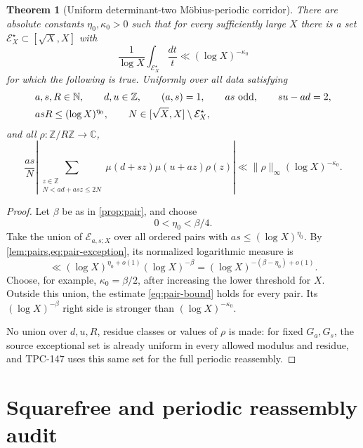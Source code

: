 \documentclass[11pt]{article}
\newtheorem{theorem}{Theorem}[section]
\theoremstyle{definition}
\theoremstyle{remark}
\begin{document}
\begin{theorem}[Uniform determinant-two M\"obius-periodic corridor]
\label{thm:main}
There are absolute constants \(\eta_0,\kappa_0>0\) such that for
every sufficiently large \(X\) there is a set
\(\mathcal E_X^\star\subset[\sqrt X,X]\) with
\begin{equation}
 \boxed{
 \frac1{\log X}\int_{\mathcal E_X^\star}\frac{dt}{t}
 \ll(\log X)^{-\kappa_0}}
\label{eq:main-exception}
\end{equation}
for which the following is true.  Uniformly over all data satisfying
\begin{align}
 &a,s,R\in\mathbb N,\qquad d,u\in\mathbb Z,\qquad
 (a,s)=1,\qquad as\ {\rm odd},\qquad su-ad=2,\notag\\
 &asR\le(\log X)^{\eta_0},\qquad
 N\in[\sqrt X,X]\setminus\mathcal E_X^\star,
\label{eq:envelope}
\end{align}
and all \(\rho:\mathbb Z/R\mathbb Z\to\mathbb C\),
\begin{equation}
 \boxed{
 \frac{as}{N}
 \left|
 \sum_{\substack{z\in\mathbb Z\\N<ad+asz\le2N}}
 \mu(d+sz)\mu(u+az)\rho(z)
 \right|
 \ll
 \|\rho\|_\infty(\log X)^{-\kappa_0}.}
\label{eq:main}
\end{equation}
\end{theorem}

\begin{proof}
Let \(\beta\) be as in \cref{prop:pair}, and choose
\[
 0<\eta_0<\beta/4.
\]
Take the union of \(\mathcal E_{a,s;X}\) over all ordered pairs with
\(as\le(\log X)^{\eta_0}\).  By
\cref{lem:pairs,eq:pair-exception}, its normalized logarithmic
measure is
\[
 \ll
 (\log X)^{\eta_0+o(1)}(\log X)^{-\beta}
 =
 (\log X)^{-(\beta-\eta_0)+o(1)}.
\]
Choose, for example, \(\kappa_0=\beta/2\), after increasing the
lower threshold for \(X\).  Outside this union, the estimate
\eqref{eq:pair-bound} holds for every pair.  Its
\((\log X)^{-\beta}\) right side is stronger than
\((\log X)^{-\kappa_0}\).

No union over \(d,u,R\), residue classes or values of \(\rho\) is
made: for fixed \(G_a,G_s\), the source exceptional set is already
uniform in every allowed modulus and residue, and TPC-147 uses this
same set for the full periodic reassembly.
\end{proof}

\section{Squarefree and periodic reassembly audit}
\end{document}
